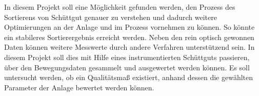 In diesem Projekt soll eine Möglichkeit gefunden werden, den Prozess des Sortierens von Schüttgut genauer zu verstehen und dadurch weitere Optimierungen an der Anlage und im Prozess vornehmen zu können. So könnte ein stabileres Sortierergebnis erreicht werden. Neben den rein optisch gewonnen Daten können weitere Messwerte durch andere Verfahren unterstützend sein. In diesem Projekt soll dies mit Hilfe eines instrumentierten Schüttguts passieren, über den Bewegungsdaten gesammelt und ausgewertet werden können. Es soll untersucht werden, ob ein Qualitätsmaß existiert, anhand dessen die gewählten Parameter der Anlage bewertet werden können.

